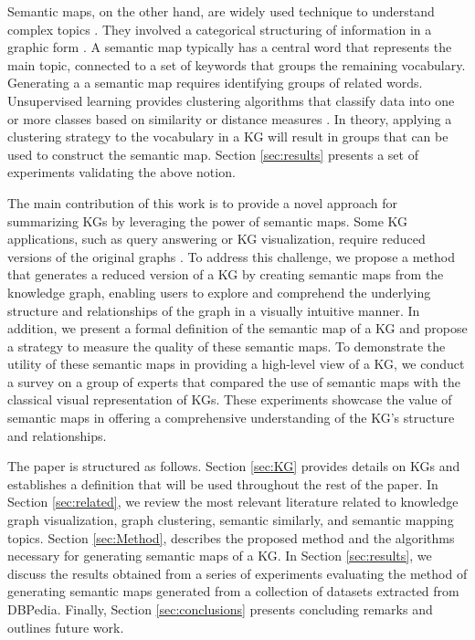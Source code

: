 \documentclass{ieeeaccess}
\begin{document}
Semantic maps, on the other hand, are widely used 
technique to understand complex topics 
\cite{SemanticMaps19}. They involved 
a categorical structuring of information in a
graphic form \cite{johnson1986semantic}. A semantic map
typically has a central word that represents the main
topic, connected to a set of keywords that
groups the remaining vocabulary. Generating a
a semantic map requires identifying groups of 
related words. Unsupervised learning provides 
clustering algorithms that classify data into one or 
more classes based on similarity or distance 
measures \cite{SCHAEFFER200727}. In theory, applying
a clustering strategy to the vocabulary in a KG will
result in groups that can be used to construct the 
semantic map. Section \ref{sec:results} presents a set of 
experiments validating the above notion.

The main contribution of this work is to provide 
a novel approach for summarizing KGs by leveraging
the power of semantic maps. Some KG applications, 
such as query answering or KG visualization, 
require reduced versions of the original graphs \cite{gomez2018visualizing,Jalota2021}. To address
this challenge, we propose a method that generates 
a reduced version of a KG by creating semantic maps
from the knowledge graph, enabling users to 
explore and comprehend the underlying structure and 
relationships of the graph in a visually intuitive manner. 
In addition, we present a formal definition of the semantic 
map of a KG and propose a strategy to measure the quality
of these semantic maps. To demonstrate the utility of these
semantic maps in providing a high-level view of a KG, we 
conduct a survey on a group of experts that compared the use
of semantic maps with the classical visual representation 
of KGs. These experiments showcase
the value of semantic maps in offering a comprehensive 
understanding of the KG's structure and relationships.


The paper is structured as follows. Section \ref{sec:KG} 
provides details on KGs and establishes a definition that
will be used throughout the rest of the paper. In Section \ref{sec:related}, we review the most relevant 
literature related to knowledge graph 
visualization, graph clustering, semantic similarly,
and semantic mapping topics. Section \ref{sec:Method},
describes the proposed method and the algorithms necessary
for generating semantic maps of a KG. In Section 
\ref{sec:results}, we discuss the results obtained from
a series of experiments evaluating the method of 
generating semantic maps generated from a collection
of datasets extracted from DBPedia. Finally, Section 
\ref{sec:conclusions} presents concluding remarks and 
outlines future work.
\end{document}
